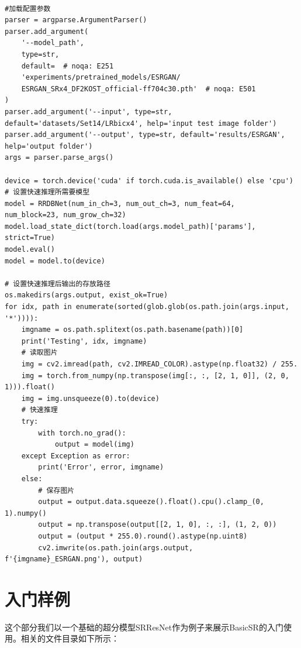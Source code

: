 \documentclass[../main.tex]{subfiles}
\begin{document}
\begin{verbatim}

#加载配置参数
parser = argparse.ArgumentParser()
parser.add_argument(
    '--model_path',
    type=str,
    default=  # noqa: E251
    'experiments/pretrained_models/ESRGAN/
    ESRGAN_SRx4_DF2KOST_official-ff704c30.pth'  # noqa: E501
)
parser.add_argument('--input', type=str,
default='datasets/Set14/LRbicx4', help='input test image folder')
parser.add_argument('--output', type=str, default='results/ESRGAN',
help='output folder')
args = parser.parse_args()

device = torch.device('cuda' if torch.cuda.is_available() else 'cpu')
# 设置快速推理所需要模型
model = RRDBNet(num_in_ch=3, num_out_ch=3, num_feat=64,
num_block=23, num_grow_ch=32)
model.load_state_dict(torch.load(args.model_path)['params'], strict=True)
model.eval()
model = model.to(device)

# 设置快速推理后输出的存放路径
os.makedirs(args.output, exist_ok=True)
for idx, path in enumerate(sorted(glob.glob(os.path.join(args.input, '*')))):
    imgname = os.path.splitext(os.path.basename(path))[0]
    print('Testing', idx, imgname)
    # 读取图片
    img = cv2.imread(path, cv2.IMREAD_COLOR).astype(np.float32) / 255.
    img = torch.from_numpy(np.transpose(img[:, :, [2, 1, 0]], (2, 0, 1))).float()
    img = img.unsqueeze(0).to(device)
    # 快速推理
    try:
        with torch.no_grad():
            output = model(img)
    except Exception as error:
        print('Error', error, imgname)
    else:
        # 保存图片
        output = output.data.squeeze().float().cpu().clamp_(0, 1).numpy()
        output = np.transpose(output[[2, 1, 0], :, :], (1, 2, 0))
        output = (output * 255.0).round().astype(np.uint8)
        cv2.imwrite(os.path.join(args.output, f'{imgname}_ESRGAN.png'), output)
\end{verbatim}


\section{入门样例}

这个部分我们以一个基础的超分模型SRResNet作为例子来展示BasicSR的入门使用。相关的文件目录如下所示：
\end{document}
